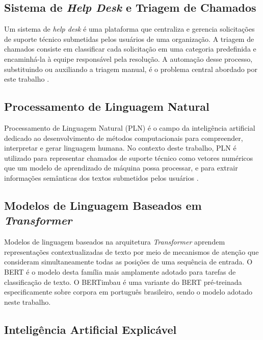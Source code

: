 \documentclass[
    12pt,                %
    openright,           %
    oneside,             %
    a4paper,             %
    english,             %
    brazil               %
]{abntex2}
\begin{document}
\subsection{Sistema de \textit{Help Desk} e Triagem de Chamados}
 
Um sistema de \textit{help desk} é uma plataforma que centraliza e gerencia solicitações de suporte técnico submetidas pelos usuários de uma organização. A triagem de chamados consiste em classificar cada solicitação em uma categoria predefinida e encaminhá-la à equipe responsável pela resolução. A automação desse processo, substituindo ou auxiliando a triagem manual, é o problema central abordado por este trabalho \cite{zemp2021}.

\subsection{Processamento de Linguagem Natural}
 
Processamento de Linguagem Natural (PLN) é o campo da inteligência artificial dedicado ao desenvolvimento de métodos computacionais para compreender, interpretar e gerar linguagem humana. No contexto deste trabalho, PLN é utilizado para representar chamados de suporte técnico como vetores numéricos que um modelo de aprendizado de máquina possa processar, e para extrair informações semânticas dos textos submetidos pelos usuários \cite{devlin2019}.
 
\subsection{Modelos de Linguagem Baseados em \textit{Transformer}}
 
Modelos de linguagem baseados na arquitetura \textit{Transformer} \cite{vaswani2017} aprendem representações contextualizadas de texto por meio de mecanismos de atenção que consideram simultaneamente todas as posições de uma sequência de entrada. O BERT \cite{devlin2019} é o modelo desta família mais amplamente adotado para tarefas de classificação de texto. O BERTimbau \cite{souza2020} é uma variante do BERT pré-treinada especificamente sobre corpora em português brasileiro, sendo o modelo adotado neste trabalho.
 
\subsection{Inteligência Artificial Explicável}
 
\end{document}
